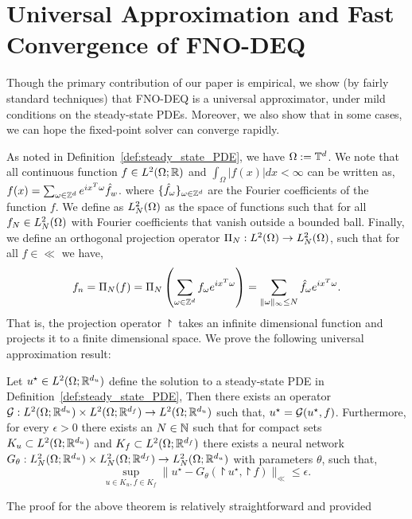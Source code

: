 \section{Universal Approximation and Fast Convergence of FNO-DEQ}
\label{subsec:universal_approximation}

Though the primary contribution of our paper is empirical, we show (by fairly standard techniques) that FNO-DEQ is a universal approximator, under mild conditions on the steady-state PDEs. Moreover, we also show that in some cases, we can hope the fixed-point solver can converge rapidly.  

As noted in Definition~\ref{def:steady_state_PDE}, 
we have $\Omega:= {\mathbb{T}}^d$.
We note that all continuous function 
$f \in L^2(\Omega; \mathbb{R})$ and 
$\int_\Omega |f(x)| dx < \infty$
can be written as,
$f(x) = \sum_{\omega \in \mathbb{Z}^d} e^{i x^T \omega} \hat{f}_w$. 
where $\{\hat{f}_\omega\}_{\omega \in \mathbb{Z}^d}$
are the Fourier coefficients of the function $f$.
We define as $L^2_N(\Omega)$ as the space of functions such that for all $f_N \in L^2_N(\Omega)$ 
with Fourier coefficients that vanish outside a bounded ball.
Finally, we define an orthogonal projection operator $\Pi_N: L^2(\Omega) \to L^2_N(\Omega)$, 
such that 
for all $f \in \ll$ we have,
\begin{equation}
    \label{eq:projection_definition}
    f_n = \Pi_N(f) = \Pi_N\left(\sum_{\omega \in \mathbb{Z}^d} f_\omega e^{i x^T \omega}\right) = 
    \sum_{\|\omega\|_\infty \leq N} \hat{f}_\omega e^{i x^T \omega}.
\end{equation}
That is, the projection operator $\project$ takes an infinite dimensional function and projects it 
to a finite dimensional space. We prove the following universal approximation result:
\begin{theorem}
    \label{thm:main_theorem}
    Let $u^\star \in L^2(\Omega;\mathbb{R}^{d_u})$ define the solution to a
    steady-state PDE
    in 
    Definition~\ref{def:steady_state_PDE},
    Then there exists an operator 
    ${\mathcal{G}}: L^2(\Omega;\mathbb{R}^{d_u}) \times L^2(\Omega;\mathbb{R}^{d_f}) \to L^2(\Omega;\mathbb{R}^{d_u})$
    such that,
    $u^\star = {\mathcal{G}}(u^\star, f)$.
    Furthermore,
    for every $\epsilon > 0$ there exists an $N \in \mathbb{N}$
    such that
    for compact sets $K_u \subset L^2(\Omega;\mathbb{R}^{d_u})$ and $K_f \subset L^2(\Omega;\mathbb{R}^{d_f})$
    there exists a neural network 
    $G_\theta: L^2_N(\Omega;\mathbb{R}^{d_u}) \times L^2_N(\Omega;\mathbb{R}^{d_f}) \to L^2_N(\Omega;\mathbb{R}^{d_u})$
    with parameters $\theta$,
    such that,
    $$\sup_{u \in K_u, f \in K_f} \|u^\star- G_\theta(\project u^\star, \project f)\|_{\ll} \leq \epsilon.$$
\end{theorem}
The proof for the above theorem is relatively straightforward and provided
